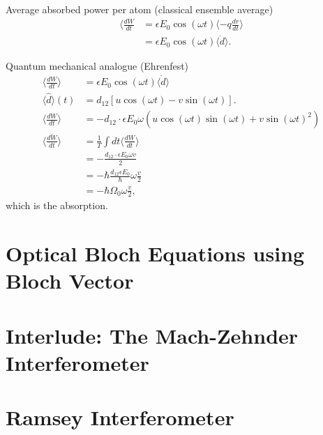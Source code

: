 \documentclass[../../note.tex]{subfiles}
\begin{document}
\begin{itemize}
    Average absorbed power per atom (classical ensemble average)
    \begin{align}
        \langle \frac{d W}{d t} 
        &= \epsilon E_0 \cos(\omega t)\langle -q \frac{d r}{d t} \rangle \\
        &= \epsilon E_0 \cos(\omega t) \langle \dot{d} \rangle.
    \end{align}

    Quantum mechanical analogue (Ehrenfest)
    \begin{align}
        \langle \frac{d W}{d t} \rangle
        &= \epsilon E_0 \cos(\omega t) \langle \dot{d} \rangle \\
        \langle \hat{d} \rangle(t)
        &= d_{12} [u \cos(\omega t) - v \sin(\omega t)]. \\
        \langle \frac{d W}{d t} \rangle
        &= -d_{12} \cdot \epsilon E_0 \omega (u \cos(\omega t) \sin(\omega t) + v \sin(\omega t)^2) \\
        \overline{\langle \frac{d W}{d t} \rangle}
        &= \frac{1}{T} \int dt \langle \frac{d W}{d t} \rangle \\
        &= - \frac{d_{12} \cdot \epsilon E_0 \omega v}{2} \\
        &= - \hbar \frac{d_{12} \epsilon E_0}{\hbar} \omega \frac{v}{2} \\
        &= - \hbar \Omega_0 \omega \frac{v}{2},
    \end{align}
    which is the absorption.
\end{itemize}

\section{Optical Bloch Equations using Bloch Vector}


\section{Interlude: The Mach-Zehnder Interferometer}

\section{Ramsey Interferometer}


\end{document}
